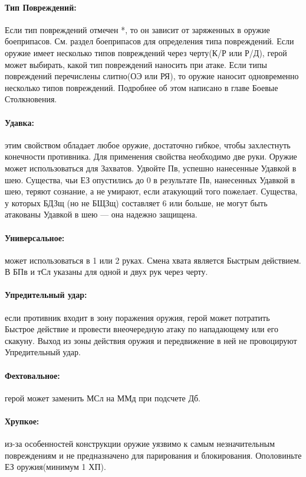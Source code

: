 \paragraph{Тип Повреждений:}

\newline
Если тип повреждений отмечен *, то он зависит от заряженных в оружие боеприпасов. См. раздел боеприпасов для определения типа повреждений.
\newline
Если оружие имеет несколько типов повреждений через черту(К/Р или Р/Д), герой может выбирать, какой тип повреждений наносить при атаке. Если типы повреждений перечислены слитно(ОЭ или РЯ), то оружие наносит одновременно несколько типов повреждений. Подробнее об этом написано в главе Боевые Столкновения.
\paragraph{Удавка:} этим свойством обладает любое оружие, достаточно гибкое, чтобы захлестнуть конечности противника. Для применения свойства необходимо две руки. Оружие может использоваться для Захватов. Удвойте Пв, успешно нанесенные Удавкой в шею. Существа, чьи ЕЗ опустились до 0 в результате Пв, нанесенных Удавкой в шею, теряют сознание, а не умирают, если атакующий того пожелает. Существа, у которых БДЗщ (но не БЩЗщ) составляет 6 или больше, не могут быть атакованы Удавкой в шею — она надежно защищена.
\paragraph{Универсальное:} может использоваться в 1 или 2 руках. Смена хвата является Быстрым действием. В БПв и тСл указаны для одной и двух рук через черту.
\paragraph{Упредительный удар:} если противник входит в зону поражения оружия, герой может потратить Быстрое действие и провести внеочередную атаку по нападающему или его скакуну. Выход из зоны действия оружия и передвижение в ней не провоцируют Упредительный удар.
\paragraph{Фехтовальное:} герой может заменить МСл на ММд при подсчете Дб.
\paragraph{Хрупкое:} из-за особенностей конструкции оружие уязвимо к самым незначительным повреждениям и не предназначено для парирования и блокирования. Ополовиньте ЕЗ оружия(минимум 1 ХП).

